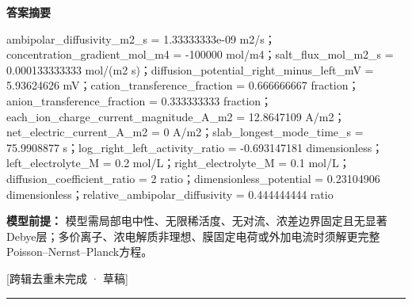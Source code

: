 \documentclass[UTF8,11pt,a4paper]{ctexart}
\begin{document}
\noindent\textbf{答案摘要}\par
ambipolar\_diffusivity\_m2\_s = 1.33333333e-09 m2/s；concentration\_gradient\_mol\_m4 = -100000 mol/m4；salt\_flux\_mol\_m2\_s = 0.000133333333 mol/(m2 s)；diffusion\_potential\_right\_minus\_left\_mV = 5.93624626 mV；cation\_transference\_fraction = 0.666666667 fraction；anion\_transference\_fraction = 0.333333333 fraction；each\_ion\_charge\_current\_magnitude\_A\_m2 = 12.8647109 A/m2；net\_electric\_current\_A\_m2 = 0 A/m2；slab\_longest\_mode\_time\_s = 75.9908877 s；log\_right\_left\_activity\_ratio = -0.693147181 dimensionless；left\_electrolyte\_M = 0.2 mol/L；right\_electrolyte\_M = 0.1 mol/L；diffusion\_coefficient\_ratio = 2 ratio；dimensionless\_potential = 0.23104906 dimensionless；relative\_ambipolar\_diffusivity = 0.444444444 ratio\par
\noindent\textbf{模型前提：}
模型需局部电中性、无限稀活度、无对流、浓差边界固定且无显著Debye层；多价离子、浓电解质非理想、膜固定电荷或外加电流时须解更完整Poisson–Nernst–Planck方程。\par
\noindent\textcolor{red!65!black}{[跨辑去重未完成 · 草稿]} \par
\medskip\hrule\medskip
{}
\end{document}
